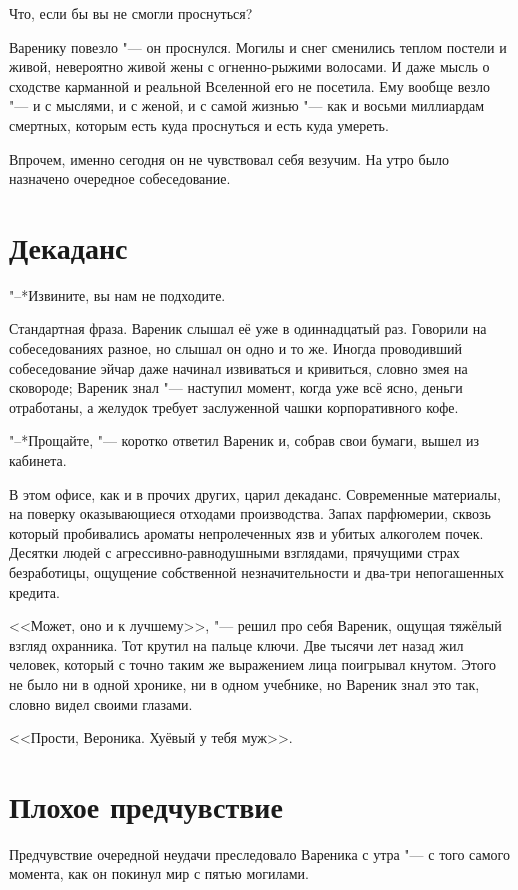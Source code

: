 Что, если бы вы не смогли проснуться?

Варенику повезло "--- он проснулся.
Могилы и снег сменились теплом постели и живой, невероятно живой жены с огненно-рыжими волосами.
И даже мысль о сходстве карманной и реальной Вселенной его не посетила.
Ему вообще везло "--- и с мыслями, и с женой, и с самой жизнью "--- как и восьми миллиардам смертных, которым есть куда проснуться и есть куда умереть.

Впрочем, именно сегодня он не чувствовал себя везучим.
На утро было назначено очередное собеседование.

\section{Декаданс}

"--*Извините, вы нам не подходите.

Стандартная фраза.
Вареник слышал её уже в одиннадцатый раз.
Говорили на собеседованиях разное, но слышал он одно и то же.
Иногда проводивший собеседование эйчар даже начинал извиваться и кривиться, словно змея на сковороде;
Вареник знал "--- наступил момент, когда уже всё ясно, деньги отработаны, а желудок требует заслуженной чашки корпоративного кофе.

"--*Прощайте, "--- коротко ответил Вареник и, собрав свои бумаги, вышел из кабинета.

В этом офисе, как и в прочих других, царил декаданс.
Современные материалы, на поверку оказывающиеся отходами производства.
Запах парфюмерии, сквозь который пробивались ароматы непролеченных язв и убитых алкоголем почек.
Десятки людей с агрессивно-равнодушными взглядами, прячущими страх безработицы, ощущение собственной незначительности и два-три непогашенных кредита.

<<Может, оно и к лучшему>>, "--- решил про себя Вареник, ощущая тяжёлый взгляд охранника.
Тот крутил на пальце ключи.
Две тысячи лет назад жил человек, который с точно таким же выражением лица поигрывал кнутом.
Этого не было ни в одной хронике, ни в одном учебнике, но Вареник знал это так, словно видел своими глазами.

<<Прости, Вероника.
Хуёвый у тебя муж>>.

\section{Плохое предчувствие}

Предчувствие очередной неудачи преследовало Вареника с утра "--- с того самого момента, как он покинул мир с пятью могилами.

